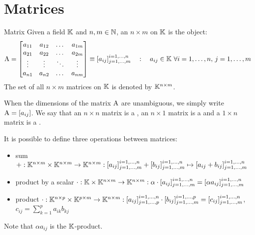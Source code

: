 
\section{Matrices}

\begin{definition}{Matrix}{}
  Given a field $ \mathbb{K} $ and $ n , m \in \mathbb{N} $, an $ n \times m $  on $ \mathbb{K} $ is the object:
  \begin{equation*}
    \mathrm{A} =
    \begin{bmatrix}
      a_{11} & a_{12} & \dots & a_{1m} \\
      a_{21} & a_{22} & \dots & a_{2m} \\
      \vdots & \vdots & \ddots & \vdots \\
      a_{n1} & a_{n2} & \dots & a_{nm}
    \end{bmatrix}
    \equiv [a_{ij}]^{i = 1, \dots, n}_{j = 1, \dots, m}
    \quad : \quad
    a_{ij} \in \mathbb{K} \,\,\forall i = 1, \dots, n ,\, j = 1, \dots, m
  \end{equation*}
  The set of all $ n \times m $ matrices on $ \mathbb{K} $ is denoted by $ \mathbb{K}^{n \times m} $.
\end{definition}

When the dimensions of the matrix $ \mathrm{A} $ are unambiguous, we simply write $ \mathrm{A} = [a_{ij}] $. We say that an $ n \times n $ matrix is a , an $ n \times 1 $ matrix is a  and a $ 1 \times n $ matrix is a .

It is possible to define three operations between matrices:
\begin{itemize}
  \item sum $ + : \mathbb{K}^{n \times m} \times \mathbb{K}^{n \times m} \rightarrow \mathbb{K}^{n \times m} : [a_{ij}]^{i = 1, \dots, n}_{j = 1, \dots, m} + [b_{ij}]^{i = 1, \dots, n}_{j = 1, \dots, m} \mapsto [a_{ij} + b_{ij}]^{i = 1, \dots, n}_{j = 1, \dots, m} $
  \item product by a scalar $ \cdot : \mathbb{K} \times \mathbb{K}^{n \times m} \rightarrow \mathbb{K}^{n \times m} : \alpha \cdot [a_{ij}]^{i = 1, \dots, n}_{j = 1, \dots, m} = [\alpha a_{ij}]^{i = 1, \dots, n}_{j = 1, \dots, m} $
  \item product $ \cdot : \mathbb{K}^{n \times p} \times \mathbb{K}^{p \times m} \rightarrow \mathbb{K}^{n \times m} : [a_{ij}]^{i = 1, \dots, n}_{j = 1, \dots, p} \cdot [b_{ij}]^{i = 1, \dots, p}_{j = 1, \dots, m} = [c_{ij}]^{i = 1, \dots, n}_{j = 1, \dots, m} $, $ c_{ij} = \sum_{k = 1}^p a_{ik} b_{kj} $
\end{itemize}
Note that $ \alpha a_{ij} $ is the $ \mathbb{K} $-product.

